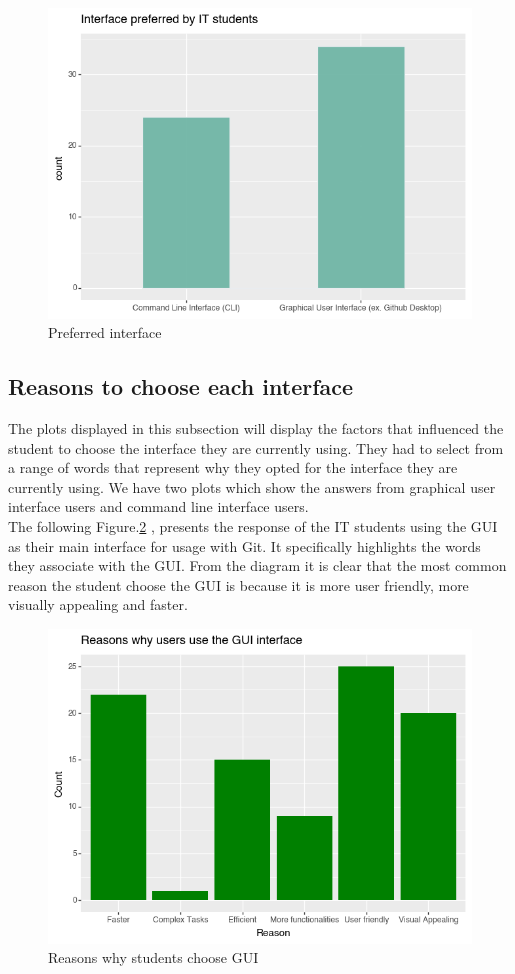 \documentclass[]{report}
\begin{document}
	
	\begin{figure}[H]
		\centering
		\includegraphics[width=0.75\linewidth]{preferredInterface}
		\caption{Preferred interface}
		\label{fig: 3}
	\end{figure}
	
	\subsection{Reasons to choose each interface}
	The plots displayed in this subsection will display the factors that influenced the student to choose the interface they are currently using. They had to select from a range of words that represent why they opted for the interface they are currently using. We have two plots which show the answers from graphical user interface users and command line interface users. \\
	
	The following Figure.\ref{fig: 4} , presents the response of the IT students using the GUI as their main interface for usage with Git. It specifically highlights the words they associate with the GUI. From the diagram it is clear that the most common reason the student choose the GUI is because it is more user friendly, more visually appealing and faster.
	
		\begin{figure}[H]
		\centering
		\includegraphics[width=0.75\linewidth]{ReasonsGUI}
		\caption{Reasons why students choose GUI}
		\label{fig: 4}
	\end{figure}
	
\end{document}
